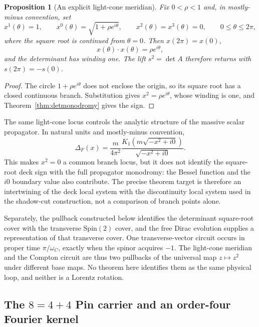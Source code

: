 \documentclass[11pt]{article}
\newtheorem{proposition}[theorem]{Proposition}
\theoremstyle{definition}\newtheorem{definition}[theorem]{Definition}
\theoremstyle{remark}\newtheorem{remark}[theorem]{Remark}\newtheorem{conjecture}[theorem]{Conjecture}
\begin{document}
\begin{proposition}[An explicit light-cone meridian]\label{prop:lightconemeridian}
Fix $0<\rho<1$ and, in mostly-minus convention, set
\begin{equation}
 x^1(\theta)=1,\qquad
 x^0(\theta)=\sqrt{1+\rho e^{i\theta}},\qquad
 x^2(\theta)=x^3(\theta)=0,\qquad 0\le\theta\le2\pi,
\end{equation}
where the square root is continued from $\theta=0$. Then $x(2\pi)=x(0)$,
\begin{equation}
 x(\theta)\cdot x(\theta)=\rho e^{i\theta},
\end{equation}
and the determinant has winding one. The lift $s^2=\det A$ therefore returns with $s(2\pi)=-s(0)$.
\end{proposition}
\begin{proof}
The circle $1+\rho e^{i\theta}$ does not enclose the origin, so its square root has a closed continuous branch. Substitution gives $x^2=\rho e^{i\theta}$, whose winding is one, and Theorem~\ref{thm:detmonodromy} gives the sign.
\end{proof}

The same light-cone locus controls the analytic structure of the massive scalar propagator. In natural units and mostly-minus convention,
\begin{equation}\label{eq:massivepropbranch}
 \Delta_F(x)=\frac{m}{4\pi^2}
 \frac{K_1\!\left(m\sqrt{-x^2+i0}\right)}
 {\sqrt{-x^2+i0}}.
\end{equation}
This makes $x^2=0$ a common branch locus, but it does not identify the square-root deck sign with the full propagator monodromy: the Bessel function and the $i0$ boundary value also contribute. The precise theorem target is therefore an intertwining of the deck local system with the discontinuity local system used in the shadow-cut construction, not a comparison of branch points alone.

Separately, the pullback constructed below identifies the determinant square-root cover with the transverse $\mathrm{Spin}(2)$ cover, and the free Dirac evolution supplies a representation of that transverse cover. One transverse-vector circuit occurs in proper time $\pi/\omega_C$, exactly when the spinor acquires $-1$. The light-cone meridian and the Compton circuit are thus two pullbacks of the universal map $z\mapsto z^2$ under different base maps. No theorem here identifies them as the same physical loop, and neither is a Lorentz rotation.

\subsection{The \texorpdfstring{$8=4+4$}{8=4+4} Pin carrier and an order-four Fourier kernel}
\end{document}
